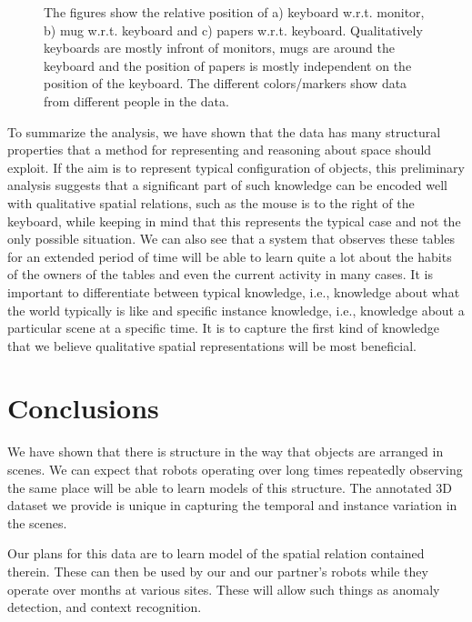\documentclass[letterpaper, 10 pt, conference]{ieeeconf}  %
\begin{document}
\begin{figure}
\begin{center}
\end{center}
\caption{The figures show the relative position of a) keyboard w.r.t. monitor, b) mug w.r.t. keyboard and c) papers w.r.t. keyboard. Qualitatively keyboards are mostly infront of monitors, mugs are around the keyboard and the position of papers is mostly independent on the position of the keyboard. The different colors/markers show data from different people in the data.} 
\label{fig:scatter-rest}
\end{figure}

To summarize the analysis, we have shown that the data has many structural properties that a method for representing and reasoning about 
space should exploit. If the aim is to represent typical configuration of objects, this preliminary analysis suggests that a significant 
part of such knowledge can be encoded well with qualitative spatial relations, such as the mouse is to the right of the keyboard, while 
keeping in mind that this represents the typical case and not the only possible situation. We can also see that a system that observes these tables for 
an extended period of time will be able to learn quite a lot about the habits of the owners of the tables and even the current activity in 
many cases. It is important to differentiate between typical knowledge, i.e., knowledge about what the world typically is like and specific 
instance knowledge, i.e., knowledge about a particular scene at a specific time. It is to capture the first kind of knowledge that we 
believe  qualitative spatial representations will be most beneficial. 

\section{Conclusions}
\label{sec:Conclusions}

We have shown that there is structure in the way that objects are
arranged in scenes.  We can expect that robots operating over long
times repeatedly observing the same place will be able to learn models
of this structure.  The annotated 3D dataset we provide is unique in
capturing the temporal and instance variation in the scenes.

Our plans for this data are to learn model of the spatial relation
contained therein.  These can then be used by our and our partner's
robots while they operate over months at various sites.  These will
allow such things as anomaly detection, and context recognition.
\end{document}
